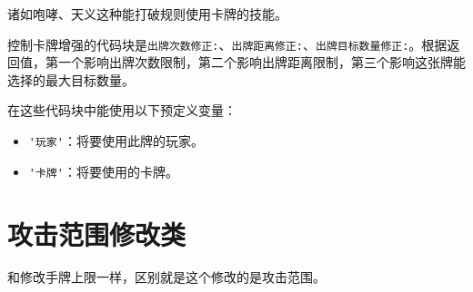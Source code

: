 诸如咆哮、天义这种能打破规则使用卡牌的技能。

控制卡牌增强的代码块是\verb|出牌次数修正:|、\verb|出牌距离修正:|、\verb|出牌目标数量修正:|。根据返回值，第一个影响出牌次数限制，第二个影响出牌距离限制，第三个影响这张牌能选择的最大目标数量。

在这些代码块中能使用以下预定义变量：

\begin{itemize}
 \item \verb|'玩家'|：将要使用此牌的玩家。
 \item \verb|'卡牌'|：将要使用的卡牌。
\end{itemize}

\section{攻击范围修改类}

和修改手牌上限一样，区别就是这个修改的是攻击范围。
